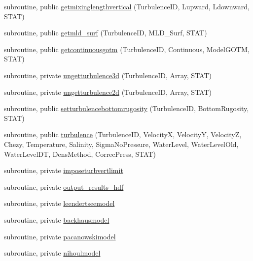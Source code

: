 \begin{DoxyCompactItemize}
\item 
subroutine, public \mbox{\hyperlink{namespacemoduleturbulence_a9ca6f654636dff4860b7e20134c59253}{getmixinglengthvertical}} (Turbulence\+ID, Lupward, Ldownward, S\+T\+AT)
\item 
subroutine, public \mbox{\hyperlink{namespacemoduleturbulence_a8e849950710589a5439a724899ac2b8d}{getmld\+\_\+surf}} (Turbulence\+ID, M\+L\+D\+\_\+\+Surf, S\+T\+AT)
\item 
subroutine, public \mbox{\hyperlink{namespacemoduleturbulence_a78bc503a0ceb792c161200d1e1e51bf0}{getcontinuousgotm}} (Turbulence\+ID, Continuous, Model\+G\+O\+TM, S\+T\+AT)
\item 
subroutine, private \mbox{\hyperlink{namespacemoduleturbulence_a3efe4fb95ca7fe2eff42a33023683bd8}{ungetturbulence3d}} (Turbulence\+ID, Array, S\+T\+AT)
\item 
subroutine, private \mbox{\hyperlink{namespacemoduleturbulence_a036689ae17a2c12c06edbd02b17281c1}{ungetturbulence2d}} (Turbulence\+ID, Array, S\+T\+AT)
\item 
subroutine, public \mbox{\hyperlink{namespacemoduleturbulence_a9df29956676b28634ce0733aa108c62e}{setturbulencebottomrugosity}} (Turbulence\+ID, Bottom\+Rugosity, S\+T\+AT)
\item 
subroutine, public \mbox{\hyperlink{namespacemoduleturbulence_aa75d43b0bd3a1b14c9baa4fe1ba2e6f7}{turbulence}} (Turbulence\+ID, VelocityX, VelocityY, VelocityZ, Chezy, Temperature, Salinity, Sigma\+No\+Pressure, Water\+Level, Water\+Level\+Old, Water\+Level\+DT, Dens\+Method, Correc\+Press, S\+T\+AT)
\item 
subroutine, private \mbox{\hyperlink{namespacemoduleturbulence_a5f1e04626a1dd3845c37639bd960e2e6}{imposeturbvertlimit}}
\item 
subroutine, private \mbox{\hyperlink{namespacemoduleturbulence_a3366379c368e20e48c460dff1f7585d8}{output\+\_\+results\+\_\+hdf}}
\item 
subroutine, private \mbox{\hyperlink{namespacemoduleturbulence_aaab5a3be952e034c14a581ba00fb2d22}{leendertseemodel}}
\item 
subroutine, private \mbox{\hyperlink{namespacemoduleturbulence_a823fa2230f79873d97eb37068c46756f}{backhausmodel}}
\item 
subroutine, private \mbox{\hyperlink{namespacemoduleturbulence_ac17c49932990b363ac1d4fc06653ff7a}{pacanowskimodel}}
\item 
subroutine, private \mbox{\hyperlink{namespacemoduleturbulence_a403c337f711237d4bc2b5d439e974a19}{nihoulmodel}}

\end{DoxyCompactItemize}
